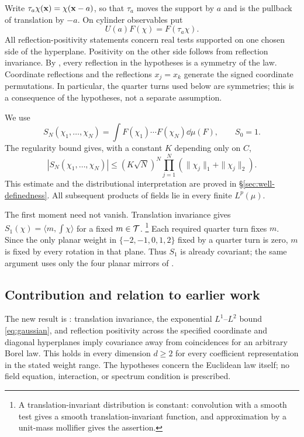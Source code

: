 Write $\tau_a\chi(\mathbf{x})=\chi(\mathbf{x}-a)$, so that $\tau_a$ moves
the support by $a$ and is the pullback of translation by $-a$.
On cylinder observables put
\begin{equation}\label{eq:U}
 U(a)F(\chi)=F(\tau_a\chi).
\end{equation}
All reflection-positivity statements concern real tests supported on
one chosen side of the hyperplane. Positivity on the other side follows
from reflection invariance. By , every reflection in
the hypotheses is a symmetry of the law. Coordinate reflections and
the reflections $x_j=x_k$ generate the signed coordinate permutations.
In particular, the quarter turns used below are symmetries; this is
a consequence of the hypotheses, not a separate assumption.

We use
\begin{equation}\label{eq:moments}
 S_N(\chi_1,\dots,\chi_N)=\int F(\chi_1)\cdots F(\chi_N)\dd\mu(F),
 \qquad S_0=1.
\end{equation}
The regularity bound gives, with a constant $K$ depending only on $C$,
\begin{equation}\label{eq:moment_bd}
 |S_N(\chi_1,\dots,\chi_N)|\leq(K\sqrt N)^N
       \prod_{j=1}^N(\|\chi_j\|_1+\|\chi_j\|_2).
\end{equation}
This estimate and the distributional interpretation are proved in
\S\ref{sec:well-definedness}. All subsequent products of fields lie
in every finite $L^p(\mu)$.

The first moment need not vanish. Translation invariance gives
$S_1(\chi)=\langle m,\int\chi\rangle$ for a fixed $m\in\mathcal{T}$.
\footnote{A translation-invariant distribution is constant: convolution
with a smooth test gives a smooth translation-invariant function, and
approximation by a unit-mass mollifier gives the assertion.}
Each required quarter turn fixes $m$. Since the only planar weight in
$\{-2,-1,0,1,2\}$ fixed by a quarter turn is zero, $m$ is fixed by
every rotation in that plane. Thus $S_1$ is already covariant; the
same argument uses only the four planar mirrors of .

\subsection{Contribution and relation to earlier work}

The new result is : translation invariance, the exponential
$L^1$--$L^2$ bound \eqref{eq:gaussian}, and reflection positivity across the specified coordinate
and diagonal hyperplanes imply covariance away from coincidences for
an arbitrary Borel law. This holds in every dimension $d\geq2$ for
every coefficient representation in the stated weight range. The
hypotheses concern the Euclidean law itself; no field equation,
interaction, or spectrum condition is prescribed.

